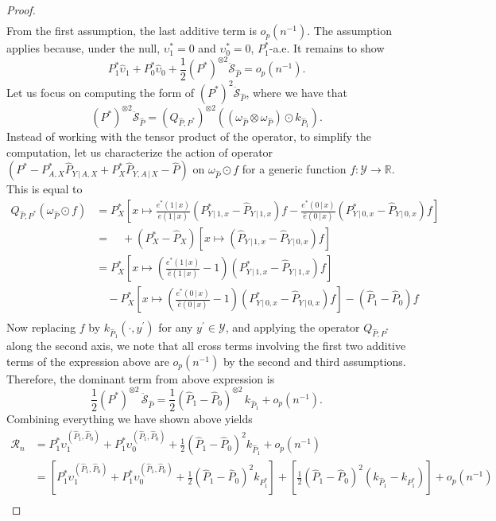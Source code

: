 \documentclass{article}
\theoremstyle{plain}
\theoremstyle{definition}
\theoremstyle{remark}
\newcommand{\R}{\mathbb{R}}
\newcommand{\of}[1]{\left(#1\right)}
\newcommand{\off}[1]{\left[#1\right]}
\newcommand{\cY}{\mathcal{Y}}
\newcommand{\ucR}{\mathscr{R}}
\newcommand{\wh}[1]{\widehat{#1}}
\newcommand{\hP}{\widehat{P}}
\newcommand{\1}{\mathbbm{1}}
\newcommand{\STE}{\mathscr{S}}
\theoremstyle{plain}
\theoremstyle{definition}
\newcommand{\mymid}{\,|\,}
\begin{document}
\begin{proof}
\begin{align*}
\end{align*}
From the first assumption, the last additive term is $o_p(n^{-1})$. The assumption applies because, under the null, $\upsilon_1^* = 0$ and $\upsilon_0^* = 0$, $P_1^*$-a.e. It remains to show
\[
P_1^* \wh\upsilon_1 + P_0^* \wh\upsilon_0 + \frac{1}{2} (P^*)^{\otimes 2} \ddot{\STE}_{\hP} = o_p(n^{-1}).
\]
Let us focus on computing the form of $(P^*)^2 \ddot{\STE}_{\hP}$, where we have that
\[
(P^*)^{\otimes 2} \ddot{\STE}_{\hP} = \of{Q_{\hP, P^*}}^{\otimes 2} \of{\of{\omega_{\hP} \otimes \omega_{\hP}} \odot k_{\hP_1}}.
\]
Instead of working with the tensor product of the operator, to simplify the computation, let us characterize the action of operator $ \of{P^* - P^*_{A, X} \hP_{Y \mymid A, X} + P^*_X \hP_{Y, A \mymid X} - \hP}$ on $\omega_{\hP} \odot f$ for a generic function $f: \cY \to \R$. This is equal to
\begin{align*}
    Q_{\hP, P^*} \of{\omega_{\hP}\odot f} &= P^*_X \off{x \mapsto \frac{e^*(1 \mymid x)}{\hat{e}(1 \mymid x)} \of{P^*_{Y \mymid 1, x} - \hP_{Y \mymid 1, x} } f - \frac{e^*(0 \mymid x)}{\hat{e}(0 \mymid x)} \of{P^*_{Y \mymid 0, x} - \hP_{Y \mymid 0, x}} f}\\
    &= \quad +  \of{P^*_X -\hP_X} \off{ x \mapsto \of{ \hP_{Y \mymid 1, x} -  \hP_{Y \mymid 0, x} }f}\\
    &= P^*_X \off{x \mapsto \of{\frac{e^*(1 \mymid x)}{\hat{e}(1 \mymid x)}-1} \of{P^*_{Y \mymid 1, x} - \hP_{Y \mymid 1, x} } f}\\
    & \quad 
    - P^*_{X}\off{x \mapsto \of{\frac{e^*(0 \mymid x)}{\hat{e}(0 \mymid x)}-1} \of{P^*_{Y \mymid 0, x} - \hP_{Y \mymid 0, x}} f} - \of{\hP_1 - \hP_0} f\\
\end{align*}
Now replacing $f$ by $k_{\hP_1}(\cdot, y^\prime)$ for any $y^\prime \in \cY$, and applying the operator $Q_{\hP, P^*}$ along the second axis, we note that all cross terms involving the first two additive terms of the expression above are $o_p(n^{-1})$ by the second and third assumptions. Therefore, the dominant term from above expression is
\[
\frac{1}{2}(P^*)^{\otimes 2} \, \ddot{\STE}_{\hP}  = \frac{1}{2}(\hP_1 - \hP_0)^{\otimes 2} \, k_{\hP_1} + o_p(n^{-1}).
\]
Combining everything we have shown above yields
\begin{align*}
    \ucR_n &= P_1^* \upsilon_1^{(\hP_1, \hP_0)} + P_1^* \upsilon_0^{(\hP_1, \hP_0)} + \frac{1}{2}(\hP_1 - \hP_0)^2 k_{\hP_1} + o_p(n^{-1})\\
    &= \off{P_1^* \upsilon_1^{(\hP_1, \hP_0)} + P_1^* \upsilon_0^{(\hP_1, \hP_0)} + \frac{1}{2}(\hP_1 - \hP_0)^2 k_{P_1^*}} + \off{\frac{1}{2}(\hP_1 - \hP_0)^2 (k_{\hP_1} - k_{P_1^*}) } + o_p(n^{-1})\\

\end{align*}
\end{proof}
\end{document}
